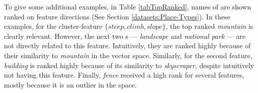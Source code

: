 To give some  additional examples, in Table \ref{tabTopRanked}, names of  are shown ranked on feature directions  (See Section \ref{datasets:Place-Types}). In these examples, for the cluster-feature $\{\textit{steep},\textit{climb},\textit{slope}\}$, the top ranked  \textit{mountain} is clearly relevant. However, the next two s --- \textit{landscape} and \textit{national park} --- are not directly related to this feature. Intuitively, they are ranked highly because of their similarity to \textit{mountain} in the vector space. Similarly, for the second feature, \textit{building} is ranked highly because of its similarity to \textit{skyscraper}, despite intuitively not having this feature. Finally, \textit{fence} received a high rank for several features,  mostly because it is an outlier in the space. 


